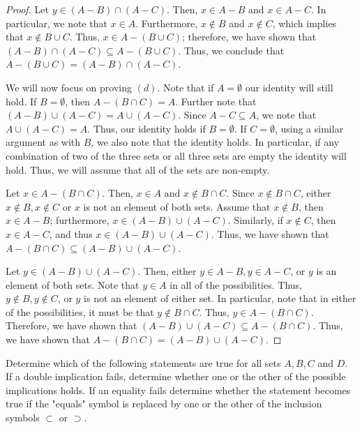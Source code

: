 \documentclass[12pt]{article}
\begin{document}
\begin{proof}
	Let $y \in (A - B) \cap (A - C)$. Then, $x \in A - B$ and $x \in A - C$. In particular, we note 
	that $x \in A$. Furthermore, $x \notin B$ and $x \notin C$, which implies that $x \notin B \cup C$.
	Thus, $x \in A - (B \cup C)$; therefore, we have shown that $(A - B) \cap (A - C) \subseteq A - 
	(B \cup C)$. Thus, we conclude that $A - (B \cup C) = (A - B) \cap (A - C)$.
	
	We will now focus on proving $(d)$. Note that if $A = \emptyset$ our identity will still hold.
	If $B = \emptyset$, then $A - (B \cap C) = A$. Further note that $(A - B) \cup (A - C) = 
	A \cup (A - C)$. Since $A - C \subseteq A$, we note that $A \cup (A - C) = A$. Thus, our identity
	holds if $B = \emptyset$. If $C = \emptyset$, using a similar argument as with $B$, we also note
	that the identity holds. In particular, if any combination of two of the three sets or all three 
	sets are empty the identity will hold. Thus, we will assume that all of the sets are non-empty.
	
	Let $x \in A - (B \cap C)$. Then, $x \in A$ and $x \notin B \cap C$. Since $x \notin B \cap C$,
	either $x \notin B, x \notin C$ or $x$ is not an element of both sets. Assume that $x \notin B$,
	then $x \in A - B$; furthermore, $x \in (A - B) \cup (A - C)$. Similarly, if $x \notin C$,
	then $x \in A - C$, and thus $x \in (A - B) \cup (A - C)$. Thus, we have shown that 
	$A - (B \cap C) \subseteq (A - B) \cup (A - C)$.
	
	Let $y \in (A - B) \cup (A - C)$. Then, either $y \in A - B, y \in A - C$, or $y$ is an element 
	of both sets. Note that $y \in A$ in all of the possibilities. Thus, $y \notin B, y \notin C$,
	or $y$ is not an element of either set. In particular, note that in either of the possibilities,
	it must be that $y \notin B \cap C$. Thus, $y \in A - (B \cap C)$. Therefore, we have shown
	that $(A - B) \cup (A - C) \subseteq A - (B \cap C)$. Thus, we have shown that 
	$A - (B \cap C) = (A - B) \cup (A - C)$.
\end{proof}

\newpage

 Determine which of the following statements are true for all sets $A,B, C$ and $D$. 
If a double implication fails, determine whether one or the other of the possible implications holds.
If an equality fails determine whether the statement becomes true if the "equals" symbol is replaced
by one or the other of the inclusion symbols $\subset$ or $\supset$.
\end{document}

